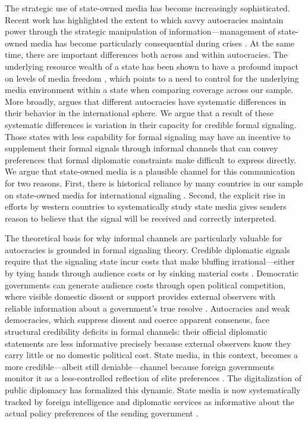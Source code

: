 \documentclass[12pt]{article}
\begin{document}
The strategic use of state-owned media has become increasingly sophisticated. Recent work has highlighted the extent to which savvy autocracies maintain power through the strategic manipulation of information---management of state-owned media has become particularly consequential during crises \citep{guriev_spin_2022}. At the same time, there are important differences both across and within autocracies. The underlying resource wealth of a state has been shown to have a profound impact on levels of media freedom \citep{egorov_why_2009}, which points to a need to control for the underlying media environment within a state when comparing coverage across our sample. More broadly, \citet{weeks_autocratic_2008} argues that different autocracies have systematic differences in their behavior in the international sphere. We argue that a result of these systematic differences is variation in their capacity for credible formal signaling. Those states with less capability for formal signaling may have an incentive to supplement their formal signals through informal channels that can convey preferences that formal diplomatic constraints make difficult to express directly. We argue that state-owned media is a plausible channel for this communication for two reasons. First, there is historical reliance by many countries in our sample on state-owned media for international signaling \citep{cohen_theatre_1987}. Second, the explicit rise in efforts by western countries to systematically study state media \citep{manor_digitalization_2019, usic_ic_2024} gives senders reason to believe that the signal will be received and correctly interpreted.

The theoretical basis for why informal channels are particularly valuable for autocracies is grounded in formal signaling theory. Credible diplomatic signals require that the signaling state incur costs that make bluffing irrational---either by tying hands through audience costs or by sinking material costs \citep{fearon_signaling_1997}. Democratic governments can generate audience costs through open political competition, where visible domestic dissent or support provides external observers with reliable information about a government's true resolve \citep{schultz_democracy_2001}. Autocracies and weak democracies, which suppress dissent and coerce apparent consensus, face structural credibility deficits in formal channels: their official diplomatic statements are less informative precisely because external observers know they carry little or no domestic political cost. State media, in this context, becomes a more credible---albeit still deniable---channel because foreign governments monitor it as a less-controlled reflection of elite preferences \citep{bjola_revisiting_2018}. The digitalization of public diplomacy has formalized this dynamic. State media is now systematically tracked by foreign intelligence and diplomatic services as informative about the actual policy preferences of the sending government \citep{manor_digitalization_2019, usic_ic_2024}.
\end{document}
